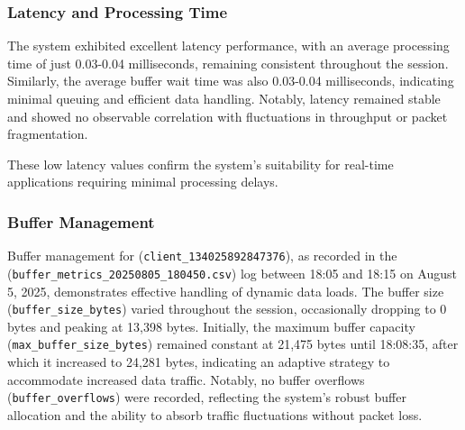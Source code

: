 \subsubsection{Latency and Processing Time}
The system exhibited excellent latency performance, with an average processing time of just 0.03-0.04 milliseconds, remaining consistent throughout the session. Similarly, the average buffer wait time was also 0.03-0.04 milliseconds, indicating minimal queuing and efficient data handling. Notably, latency remained stable and showed no observable correlation with fluctuations in throughput or packet fragmentation.

These low latency values confirm the system's suitability for real-time applications requiring minimal processing delays.

\subsubsection{Buffer Management}
Buffer management for (\texttt{client\_134025892847376}), as recorded in the (\texttt{buffer\_metrics\_20250805\_180450.csv}) log between 18:05 and 18:15 on August 5, 2025, demonstrates effective handling of dynamic data loads. The buffer size (\texttt{buffer\_size\_bytes}) varied throughout the session, occasionally dropping to 0 bytes and peaking at 13{,}398 bytes. Initially, the maximum buffer capacity (\texttt{max\_buffer\_size\_bytes}) remained constant at 21{,}475 bytes until 18:08:35, after which it increased to 24{,}281 bytes, indicating an adaptive strategy to accommodate increased data traffic. Notably, no buffer overflows (\texttt{buffer\_overflows}) were recorded, reflecting the system’s robust buffer allocation and the ability to absorb traffic fluctuations without packet loss.

